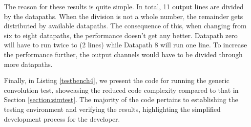 The reason for these results is quite simple. In total, 11 output lines are divided
by the datapaths. When the division is not a whole number, the remainder gets distributed
by available datapaths. The consequence of this, when changing from six to eight datapaths, the performance
doesn't get any better. Datapath zero will have to run twice to (2 lines) while Datapath 8 will run one line.
To increase the performance further, the output channels would have to be divided through more datapaths.

Finally, in Listing \ref{testbench4}, we present the code for running the generic convolution test, showcasing the reduced code complexity compared to that in Section \ref{section:simtest}. The majority of the code pertains to establishing the testing environment and verifying the results, highlighting the simplified development process for the developer.


